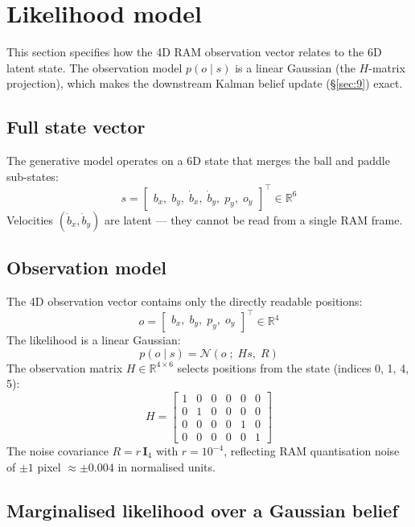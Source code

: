 \documentclass[12pt, a4paper]{article}
\newcommand{\R}{\mathbb{R}}
\newcommand{\1}{\mathbf{1}}
\newcommand{\cN}{\mathcal{N}}
\begin{document}
\section{Likelihood model}
\label{sec:8}

This section specifies how the 4D RAM observation vector relates to the 6D latent
state.  The observation model $p(o\mid s)$ is a linear Gaussian (the $H$-matrix
projection), which makes the downstream Kalman belief update (\S\ref{sec:9}) exact.

\subsection{Full state vector}

The generative model operates on a 6D state that merges the ball and paddle
sub-states:
\[
s = \begin{bmatrix} b_x,\; b_y,\; \dot b_x,\; \dot b_y,\; p_y,\; o_y \end{bmatrix}^\top
\in \R^6
\]
Velocities $(\dot b_x, \dot b_y)$ are latent --- they cannot be read from a single
RAM frame.

\subsection{Observation model}

The 4D observation vector contains only the directly readable positions:
\[
o = \begin{bmatrix} b_x,\; b_y,\; p_y,\; o_y \end{bmatrix}^\top \in \R^4
\]
The likelihood is a linear Gaussian:
\[
p(o \mid s) = \cN(o \;;\; Hs,\; R)
\]
The observation matrix $H \in \R^{4 \times 6}$ selects positions from the state
(indices 0, 1, 4, 5):
\[
H = \begin{bmatrix}
1 & 0 & 0 & 0 & 0 & 0 \\
0 & 1 & 0 & 0 & 0 & 0 \\
0 & 0 & 0 & 0 & 1 & 0 \\
0 & 0 & 0 & 0 & 0 & 1
\end{bmatrix}
\]
The noise covariance $R = r\,\mathbf{I}_4$ with $r = 10^{-4}$, reflecting RAM
quantisation noise of $\pm 1$ pixel $\approx \pm 0.004$ in normalised units.

\subsection{Marginalised likelihood over a Gaussian belief}
\end{document}
